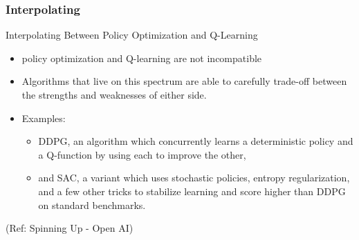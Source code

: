 \begin{frame}[fragile]\frametitle{Interpolating }

Interpolating Between Policy Optimization and Q-Learning

\begin{itemize}
\item policy optimization and Q-learning are not incompatible
\item Algorithms that live on this spectrum are able to carefully trade-off between the strengths and weaknesses of either side.
\item Examples:
\begin{itemize}
\item DDPG, an algorithm which concurrently learns a deterministic policy and a Q-function by using each to improve the other,
\item and SAC, a variant which uses stochastic policies, entropy regularization, and a few other tricks to stabilize learning and score higher than DDPG on standard benchmarks.
\end{itemize}

\end{itemize}

{\tiny (Ref: Spinning Up - Open AI)}
\end{frame}

